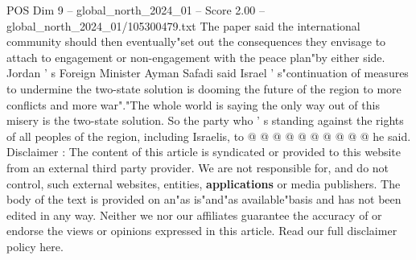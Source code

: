 \begin{textsample}{POS Dim 9 – global\_north\_2024\_01 – Score 2.00 – global\_north\_2024\_01/105300479.txt}
The paper said the international community should then eventually"set out the consequences they envisage to attach to engagement or non-engagement with the peace plan"by either side.
Jordan ' s Foreign Minister Ayman Safadi said Israel ' s"continuation of measures to undermine the two-state solution is dooming the future of the region to more conflicts and more war"."The whole world is saying the only way out of this misery is the two-state solution.
So the party who ' s standing against the rights of all peoples of the region, including Israelis, to @ @ @ @ @ @ @ @ @ @ he said.
Disclaimer : The content of this article is syndicated or provided to this website from an external third party provider.
We are not responsible for, and do not control, such external websites, entities, \textbf{applications} or media publishers.
The body of the text is provided on an"as is"and"as available"basis and has not been edited in any way.
Neither we nor our affiliates guarantee the accuracy of or endorse the views or opinions expressed in this article.
Read our full disclaimer policy here.

\end{textsample}
